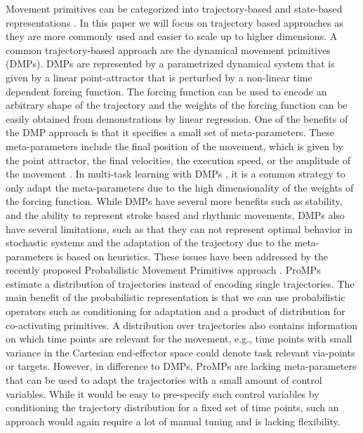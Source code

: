 \documentclass[letterpaper, 10 pt, conference]{ieeeconf}  %
\begin{document}
Movement primitives can be categorized into trajectory-based
\cite{Ijspeert2003,Rozo2013,Paraschos2013} and state-based representations
\cite{Khansari-Zadeh2011}. In this paper
we will focus on trajectory based approaches as they are more commonly used and easier to scale up to higher dimensions. A common trajectory-based
approach are the dynamical movement primitives (DMPs). DMPs \cite{Ijspeert2003} are represented by a parametrized dynamical system that is given
by a linear point-attractor that is perturbed by a non-linear time dependent forcing function. The forcing function can be used to encode an arbitrary 
shape of the trajectory and the weights of the forcing function can be easily obtained from demonstrations by linear regression. One of the benefits
of the DMP approach is that it specifies a small set of meta-parameters. These meta-parameters include the final position of 
the movement, which is given by the point attractor, the final velocities, the execution speed, or the amplitude of the movement \cite{Kober2010a,Pastor2009,Ijspeert2003}. 
In multi-task learning with DMPs \cite{Kober2010,forte2012line,Kupcsik2013}, it is a common strategy to only adapt the meta-parameters 
due to the high dimensionality of the  weights of the forcing function. While DMPs have several more benefits such as stability, 
and the ability to represent stroke based and rhythmic movements, DMPs also have several limitations, such as that they can not represent optimal behavior in stochastic systems and the adaptation of the trajectory due to the meta-parameters is based on heuristics.
These issues have been addressed by the recently proposed Probabilistic Movement Primitives approach \cite{Paraschos2013,Paraschos2013a}. 
ProMPs estimate a distribution of trajectories instead of encoding 
single trajectories. The main benefit of the probabilistic representation is that we can use probabilistic operators such 
as conditioning for adaptation and a product of distribution for co-activating primitives. 
A distribution over trajectories also contains information on which time points are relevant for the movement, 
e.g., time points with small variance in the Cartesian end-effector space could denote task relevant via-points or targets.  
However, in difference to DMPs, ProMPs are lacking meta-parameters 
that can be used to adapt the trajectories with a small amount of control variables. While it would be easy to pre-specify such control variables by 
conditioning the trajectory distribution for a fixed set of time points, such an approach would again require a lot of manual tuning and is lacking flexibility. 
\end{document}
